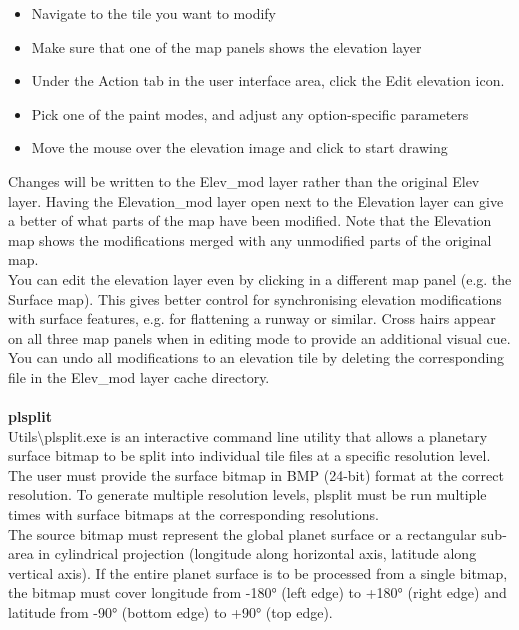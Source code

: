 \documentclass[Orbiter Developer Manual.tex]{subfiles}
\begin{document}
\begin{itemize}
\item Navigate to the tile you want to modify
\item Make sure that one of the map panels shows the elevation layer
\item Under the Action tab in the user interface area, click the Edit elevation icon.
\item Pick one of the paint modes, and adjust any option-specific parameters
\item Move the mouse over the elevation image and click to start drawing
\end{itemize}

\noindent
Changes will be written to the Elev\_mod layer rather than the original Elev layer. Having the Elevation\_mod layer open next to the Elevation layer can give a better of what parts of the map have been modified. Note that the Elevation map shows the modifications merged with any unmodified parts of the original map.\\
You can edit the elevation layer even by clicking in a different map panel (e.g. the Surface map). This gives better control for synchronising elevation modifications with surface features, e.g. for flattening a runway or similar. Cross hairs appear on all three map panels when in editing mode to provide an additional visual cue.\\
You can undo all modifications to an elevation tile by deleting the corresponding file in the Elev\_mod layer cache directory.\\
\\
\textbf{plsplit}\\
Utils\textbackslash plsplit.exe is an interactive command line utility that allows a planetary surface bitmap to be split into individual tile files at a specific resolution level.\\
The user must provide the surface bitmap in BMP (24-bit) format at the correct resolution. To generate multiple resolution levels, plsplit must be run multiple times with surface bitmaps at the corresponding resolutions.\\
The source bitmap must represent the global planet surface or a rectangular sub-area in cylindrical projection (longitude along horizontal axis, latitude along vertical axis). If the entire planet surface is to be processed from a single bitmap, the bitmap must cover longitude from -180° (left edge) to +180° (right edge) and latitude from -90° (bottom edge) to +90° (top edge).\\
\end{document}
